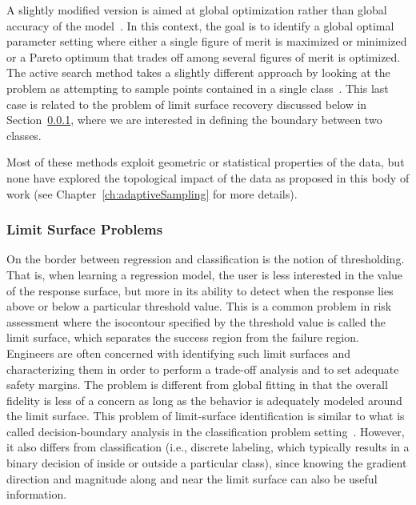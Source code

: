 A slightly modified version is aimed at global optimization rather than global accuracy of the model~\cite{MooreSchneider1996,JonesSchonlauWelch1998}.
%
In this context, the goal is to identify a global optimal parameter setting where either a single figure of merit is maximized or minimized or a Pareto optimum that trades off among several figures of merit is optimized.
%
The active search method takes a slightly different approach by looking at the problem as attempting to sample points contained in a single class~\cite{GarnettKrishnamurthyXiong2012}.
%
This last case is related to the problem of limit surface recovery discussed below in Section~\ref{sec:limitSurface}, where we are interested in defining the boundary between two classes.

Most of these methods exploit geometric or statistical properties of the data, but none have explored the topological impact of the data as proposed in this body of work (see Chapter~\ref{ch:adaptiveSampling} for more details).

\subsubsection{Limit Surface Problems}
\label{sec:limitSurface}

On the border between regression and classification is the notion of thresholding.
%
That is, when learning a regression model, the user is less interested in the value of the response surface, but more in its ability to detect when the response lies above or below a particular threshold value.
%
This is a common problem in risk assessment where the isocontour specified by the threshold value is called the limit surface, which separates the success region from the failure region.
%
Engineers are often concerned with identifying such limit surfaces and characterizing them in order to perform a trade-off analysis and to set adequate safety margins.
%
The problem is different from global fitting in that the overall fidelity is less of a concern as long as the behavior is adequately modeled around the limit surface.
%
This problem of limit-surface identification is similar to what is called decision-boundary analysis in the classification problem setting~\cite{DiamantiniPotena2007,GoLee2003,LeeLandgrebe1993,LeeLandgrebe1997,WooLee2017,ZhangLiu2005}.
%
However, it also differs from classification (i.e., discrete labeling, which typically results in a binary decision of inside or outside a particular class), since knowing the gradient direction and magnitude along and near the limit surface can also be useful information.

